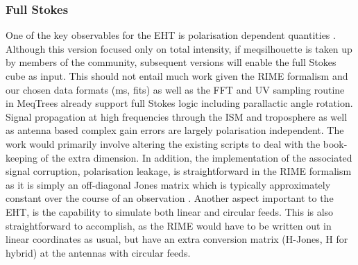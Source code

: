 \subsubsection{Full Stokes}\label{sec:full_stokes}
One of the key observables for the EHT is polarisation dependent quantities \citep{Johnson_2015b}. Although this version focused only on total intensity, if {\sc meqsilhouette} is taken up by members of the community, subsequent versions will enable the full Stokes cube as input. This should not entail much work given the RIME formalism and our chosen data formats ({\sc ms}, {\sc fits}) as well as the FFT and UV sampling routine in {\sc MeqTrees} already support full Stokes logic including parallactic angle rotation. Signal propagation at high frequencies through the ISM and troposphere as well as antenna based complex gain errors are largely polarisation independent. The work would primarily involve altering the existing scripts to deal with the book-keeping of the extra dimension. In addition, the implementation of the associated signal corruption, polarisation leakage, is straightforward in the RIME formalism as it is simply an off-diagonal Jones matrix which is typically approximately constant over the course of an observation \citep{Johnson_2015b}. Another aspect important to the EHT, is the capability to simulate both linear and circular feeds. This is also straightforward to accomplish, as the RIME would have to be written out in linear coordinates as usual, but have an extra conversion matrix (H-Jones, H for hybrid) at the antennas with circular feeds.


























